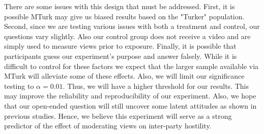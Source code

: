 \documentclass[12pt]{article}
\begin{document}
There are some issues with this design that must be addressed. First, it is possible MTurk may give us biased results based on the "Turker" population. Second, since we are testing various issues with both a treatment and control, our questions vary slightly. Also our control group does not receive a video and are simply used to measure views prior to exposure. Finally, it is possible that participants guess our experiment's purpose and answer falsely. While it is difficult to control for these factors we expect that the larger sample available via MTurk will alleviate some of these effects. Also, we will limit our significance testing to $\alpha=0.01$. Thus, we will have a higher threshold for our results. This may improve the reliability and reproducibility of our experiment. Also, we hope that our open-ended question will still uncover some latent attitudes as shown in previous studies. Hence, we believe this experiment will serve as a strong predictor of the effect of moderating views on inter-party hostility. 

\newpage




\nocite{*}
\end{document}
